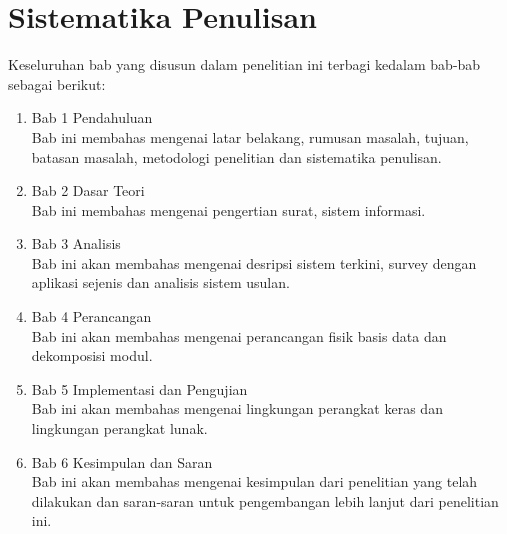 \section{Sistematika Penulisan}
\label{sec:sistematika_penulisan}
Keseluruhan bab yang disusun dalam penelitian ini terbagi kedalam bab-bab sebagai berikut:
\begin{enumerate}
	\item Bab 1 Pendahuluan \\
	Bab ini membahas mengenai latar belakang, rumusan masalah, tujuan, batasan masalah, metodologi penelitian dan sistematika penulisan.
	\item Bab 2 Dasar Teori \\
	Bab ini membahas mengenai pengertian surat, sistem informasi.
	\item Bab 3 Analisis \\
	Bab ini akan membahas mengenai desripsi sistem terkini, survey dengan aplikasi sejenis dan analisis sistem usulan.
	\item Bab 4 Perancangan \\
	Bab ini akan membahas mengenai perancangan fisik basis data dan dekomposisi modul.
	\item Bab 5 Implementasi dan Pengujian \\
	Bab ini akan membahas mengenai lingkungan perangkat keras dan lingkungan perangkat lunak.
	\item Bab 6 Kesimpulan dan Saran \\ 
	Bab ini akan membahas mengenai kesimpulan dari penelitian yang telah dilakukan dan saran-saran untuk pengembangan lebih lanjut dari penelitian ini.
\end{enumerate}
